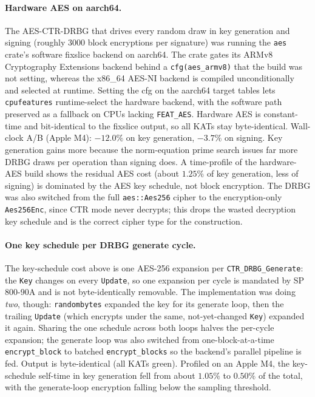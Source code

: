 \paragraph{Hardware AES on aarch64.}
The AES-CTR-DRBG that drives every random draw in key generation and
signing (roughly $3000$ block encryptions per signature) was running
the \texttt{aes} crate's software fixslice backend on aarch64.  The
crate gates its ARMv8 Cryptography Extensions backend behind a
\texttt{cfg(aes\_armv8)} that the build was not setting, whereas the
x86\_64 AES-NI backend is compiled unconditionally and selected at
runtime.  Setting the cfg on the aarch64 target tables lets
\texttt{cpufeatures} runtime-select the hardware backend, with the
software path preserved as a fallback on CPUs lacking
\texttt{FEAT\_AES}.  Hardware AES is constant-time and bit-identical to
the fixslice output, so all KATs stay byte-identical.  Wall-clock A/B
(Apple M4): $-12.0\%$ on key generation, $-3.7\%$ on signing.  Key
generation gains more because the norm-equation prime search issues far
more DRBG draws per operation than signing does.  A time-profile of the
hardware-AES build shows the residual AES cost (about $1.25\%$ of key
generation, less of signing) is dominated by the AES key schedule, not
block encryption.  The DRBG was also switched from the full
\texttt{aes::Aes256} cipher to the encryption-only \texttt{Aes256Enc},
since CTR mode never decrypts; this drops the wasted decryption key
schedule and is the correct cipher type for the construction.

\paragraph{One key schedule per DRBG generate cycle.}
The key-schedule cost above is one AES-256 expansion per
\texttt{CTR\_DRBG\_Generate}: the \texttt{Key} changes on every
\texttt{Update}, so one expansion per cycle is mandated by SP 800-90A
and is not byte-identically removable.  The implementation was doing
\emph{two}, though: \texttt{randombytes} expanded the key for its
generate loop, then the trailing \texttt{Update} (which encrypts under
the same, not-yet-changed \texttt{Key}) expanded it again.  Sharing the
one schedule across both loops halves the per-cycle expansion; the
generate loop was also switched from one-block-at-a-time
\texttt{encrypt\_block} to batched \texttt{encrypt\_blocks} so the
backend's parallel pipeline is fed.  Output is byte-identical (all KATs
green).  Profiled on an Apple M4, the key-schedule self-time in key
generation fell from about $1.05\%$ to $0.50\%$ of the total, with the
generate-loop encryption falling below the sampling threshold.

